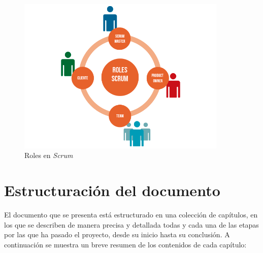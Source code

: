 \begin{figure}[H]
    \centering
    \includegraphics[width=10cm]{Images/roles.png}
    \caption{Roles en \textit{Scrum}}
\end{figure}































\section{Estructuración del documento}
El documento que se presenta está estructurado en una colección de capítulos, 
en los que se describen de manera precisa y detallada todas y cada una de 
las etapas por las que ha pasado el proyecto, desde su inicio hasta su 
conclusión. A continuación se muestra un breve resumen de los contenidos 
de cada capítulo:

